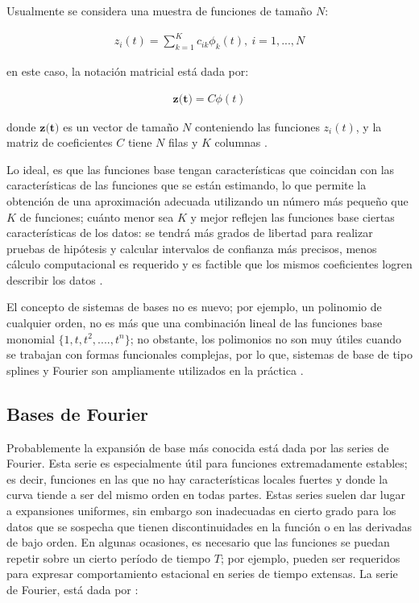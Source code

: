 \documentclass[
]{book}
\begin{document}
Usualmente se considera una muestra de funciones de tamaño \(N\):

\begin{align}
    z_i(t)=\sum_{k=1}^Kc_{ik}\phi_k(t), \ i=1,...,N
\end{align}

en este caso, la notación matricial está dada por:

\begin{align}
    \textbf{z(t)}=C\phi(t)
\end{align}

donde \(\textbf{z(t)}\) es un vector de tamaño \(N\) conteniendo las funciones \(z_i(t)\), y la matriz de coeficientes \(C\) tiene \(N\) filas y \(K\) columnas \citep{programsay}.

Lo ideal, es que las funciones base tengan características que coincidan con las características de las funciones que se están estimando, lo que permite la obtención de una aproximación adecuada utilizando un número más pequeño que \(K\) de funciones; cuánto menor sea \(K\) y mejor reflejen las funciones base ciertas características de los datos: se tendrá más grados de libertad para realizar pruebas de hipótesis y calcular intervalos de confianza más precisos, menos cálculo computacional es requerido y es factible que los mismos coeficientes logren describir los datos \citep{ramsay}.

El concepto de sistemas de bases no es nuevo; por ejemplo, un polinomio de cualquier orden, no es más que una combinación lineal de las funciones base monomial \(\{1,t,t^2,....,t^n\}\); no obstante, los polimonios no son muy útiles cuando se trabajan con formas funcionales complejas, por lo que, sistemas de base de tipo splines y Fourier son ampliamente utilizados en la práctica \citep{programsay}.

\hypertarget{bases-de-fourier}{%
\subsection*{Bases de Fourier}\label{bases-de-fourier}}

Probablemente la expansión de base más conocida está dada por las series de Fourier. Esta serie es especialmente útil para funciones extremadamente estables; es decir, funciones en las que no hay características locales fuertes y donde la curva tiende a ser del mismo orden en todas partes. Estas series suelen dar lugar a expansiones uniformes, sin embargo son inadecuadas en cierto grado para los datos que se sospecha que tienen discontinuidades en la función o en las derivadas de bajo orden\citep{ramsay}. En algunas ocasiones, es necesario que las funciones se puedan repetir sobre un cierto período de tiempo \(T\); por ejemplo, pueden ser requeridos para expresar comportamiento estacional en series de tiempo extensas. La serie de Fourier, está dada por \citep{programsay}:
\end{document}
